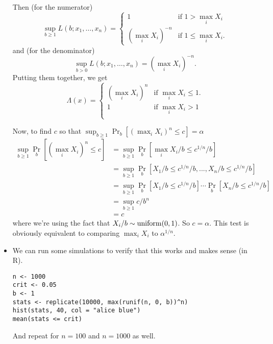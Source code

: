 \begin{itemize}
\begin{ex}
    Then (for the numerator)
    \begin{equation*}
      \sup_{b \geq 1} L(b; x_1,\dots,x_n) =
      \begin{cases}
        1 & \text{if } 1 > \max_i X_i \\
        (\max_i X_i)^{-n} & \text{if } 1 \leq \max_i X_i.
      \end{cases}
    \end{equation*}
    and (for the denominator)
    \begin{equation*}
      \sup_{b > 0} L(b; x_1,\dots,x_n) = (\max_i X_i)^{-n}.
    \end{equation*}
    Putting them together, we get
    \begin{equation*}
      \Lambda(x) =
      \begin{cases}
        (\max_i X_i)^n & \text{if } \max_i X_i \leq 1. \\
        1 & \text{if } \max_i X_i > 1 \\
      \end{cases}
    \end{equation*}

    Now, to find $c$ so that $\sup_{b \geq 1} \Pr_b[(\max_i X_i)^n \leq c] = \alpha$
    \begin{align*}
      \sup_{b \geq 1} \Pr_b[(\max_i X_i)^n \leq c]
      &= \sup_{b\geq 1} \Pr_b[\max_i X_i/b \leq c^{1/n}/b] \\
      &= \sup_{b \geq 1} \Pr_b[X_1/b \leq c^{1/n}/b, ..., X_n/b \leq c^{1/n}/b] \\
      &= \sup_{b \geq 1} \Pr_b[X_1/b \leq c^{1/n}/b] \cdots \Pr_b[X_n/b \leq c^{1/n}/b] \\
      &= \sup_{b \geq 1} c/b^n \\
      &= c
    \end{align*}
    where we're using the fact that $X_i/b \sim \operatorname{uniform}(0,1)$.  So
    $c=\alpha$.  This test is obviously equivalent to comparing $\max_i
    X_i$ to $\alpha^{1/n}$.
  \end{ex}

\item We can run some simulations to verify that this works and makes
  sense (in R).
\begin{verbatim}
n <- 1000
crit <- 0.05
b <- 1
stats <- replicate(10000, max(runif(n, 0, b))^n)
hist(stats, 40, col = "alice blue")
mean(stats <= crit)
\end{verbatim}
  And repeat for $n = 100$ and $n = 1000$ as well.
\end{itemize}

